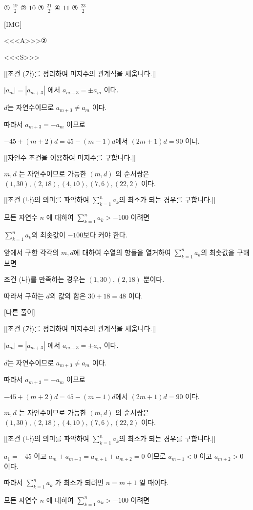 \documentclass{oblivoir}
\begin{document}
① $\frac{19}{2}$
② $10$
③ $\frac{21}{2}$
④ $11$
⑤ $\frac{23}{2}$

[IMG]

<<<A>>>②

<<<S>>>

[[조건 (가)를 정리하여 미지수의 관계식을 세웁니다.]]

$\left|a_{m}\right|=\left|a_{m+3}\right|$ 에서 $a_{m+3}=\pm a_{m}$ 이다.

$d$는 자연수이므로 $a_{m+3} \neq a_{m}$ 이다.

따라서 $a_{m+3}=-a_{m}$ 이므로

$-45+(m+2) d=45-(m-1) d$에서 $(2 m+1) d=90 $ 이다.

[[자연수 조건을 이용하여 미지수를 구합니다.]]

$m, d$ 는 자연수이므로 가능한 $(m, d)$ 의 순서쌍은 $(1,30),(2,18),(4,10),(7,6),(22,2)$ 이다.

[[조건 (나)의 의미를 파악하여 $\sum_{k=1}^{n} a_{k}$의 최소가 되는 경우를 구합니다.]]

모든 자연수 $n$ 에 대하여 $\sum_{k=1}^{n} a_{k}>-100$ 이려면 

$\sum_{k=1}^{n} a_{k}$의 최솟값이 $-100$보다 커야 한다.

앞에서 구한 각각의 $m,d$에 대하여 수열의 항들을 열거하여 $\sum_{k=1}^{n} a_{k}$의 최솟값을 구해보면

조건 (나)를 만족하는 경우는  $(1,30),(2,18)$ 뿐이다.

따라서 구하는 $d$의 값의 합은 $30+18=48$ 이다.

[다른 풀이]

[[조건 (가)를 정리하여 미지수의 관계식을 세웁니다.]]

$\left|a_{m}\right|=\left|a_{m+3}\right|$ 에서 $a_{m+3}=\pm a_{m}$ 이다.

$d$는 자연수이므로 $a_{m+3} \neq a_{m}$ 이다.

따라서 $a_{m+3}=-a_{m}$ 이므로

$-45+(m+2) d=45-(m-1) d$에서 $(2 m+1) d=90 $ 이다.

$m, d$ 는 자연수이므로 가능한 $(m, d)$ 의 순서쌍은 $(1,30),(2,18),(4,10),(7,6),(22,2)$ 이다.

[[조건 (나)의 의미를 파악하여 $\sum_{k=1}^{n} a_{k}$의 최소가 되는 경우를 구합니다.]]

$a_{1}=-45$ 이고 $a_{m}+a_{m+3}=a_{m+1}+a_{m+2}=0$ 이므로 $a_{m+1}<0$ 이고 $a_{m+2}>0$ 이다.

따라서 $\sum_{k=1}^{n} a_{k}$ 가 최소가 되려면 $n=m+1$ 일 때이다.

모든 자연수 $n$ 에 대하여 $\sum_{k=1}^{n} a_{k}>-100$ 이려면
\end{document}
